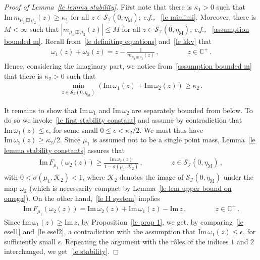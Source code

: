 \documentclass[10pt,reqno]{amsart}
\numberwithin{equation}{section}
\theoremstyle{plain}
\numberwithin{kevin}{section}
\theoremstyle{remark}
\newcommand{\im}{\mathrm{Im}\,}
\newcommand{\C}{{\mathbb C}}
\newcommand{\cf}{\emph{c.f., }}
\begin{document}
\begin{proof}[Proof of Lemma~\ref{le lemma stability}]
First note that there is $\kappa_1>0$ such that $\im m_{\mu_1\boxplus\mu_2}(z)\ge \kappa_1$ for all $z\in \mathcal{S}_{\mathcal{I}}(0,\eta_{\mathrm{M}})$; \cf~\eqref{le mimimi}. Moreover, there is $M<\infty$ such that $|m_{\mu_1\boxplus\mu_2}(z)|\le M$ for all ${z\in\mathcal{S}_{\mathcal{I}}(0,\eta_{\mathrm{M}})}$; \cf~\eqref{assumption bounded m}. Recall from~\eqref{le definiting equations} and~\eqref{le kkv} that
\begin{align}
\omega_1(z)+\omega_2(z)=z-\frac{1}{m_{\mu_1\boxplus\mu_2}(z)}\,, \qquad \qquad z\in\C^+\,.
\end{align}
Hence, considering the imaginary part, we notice from~\eqref{assumption bounded m} that there is $\kappa_2>0$ such that 
\begin{align}
\min_{z\in \mathcal{S}_{\mathcal{I}}(0,\eta_{\mathrm{M}})}(\im \omega_1(z)+\im \omega_2(z))\ge \kappa_2\,.
 \end{align}

It remains to show that $\im \omega_1$ and $\im\omega_2$ are separately bounded from below. To do so we invoke~\eqref{le first stability constant} and assume by contradiction that $\im \omega_1(z)\le \epsilon$, for some small $0\le\epsilon<\kappa_2/2$. We must thus have $\im \omega_2(z)\ge \kappa_2/2$. Since $\mu_1$ is assumed not to be a single point mass,  Lemma~\ref{le lemma stability constants} assures that 
\begin{align}\label{le esel2}
\im F_{\mu_1}(\omega_2(z))\ge \frac{\im \omega_2(z)}{1-\sigma(\mu_1,\mathcal{K}_2)} \,,\qquad\qquad z\in\mathcal{S}_{\mathcal{I}}(0,\eta_{\mathrm{M}})\,,	
\end{align}
with $0<\sigma(\mu_1,\mathcal{K}_2)<1$, where $\mathcal{K}_2$ denotes the image of $\mathcal{S}_{\mathcal{I}}(0,\eta_{\mathrm{M}})$ under the map $\omega_2$ (which is necessarily compact by Lemma~\ref{le lem upper bound on omega}). On the other hand,~\eqref{le H system} implies
\begin{align}\label{le esel1} 
\im F_{\mu_1}(\omega_2(z))=\im \omega_2(z)+\im \omega_1(z)-\im z\,,\qquad \qquad z\in\C^+\,.
\end{align}
Since $\im \omega_1(z)\ge \im z$, by Proposition~\ref{le prop 1}, we get, by comparing~\eqref{le esel1} and~\eqref{le esel2}, a contradiction with the assumption that $\im \omega_1(z)\le \epsilon$, for sufficiently small $\epsilon$. Repeating the argument with the r\^{o}les of the indices $1$ and $2$ interchanged, we get~\eqref{le stability}.\qedhere
\end{proof}
\end{document}
